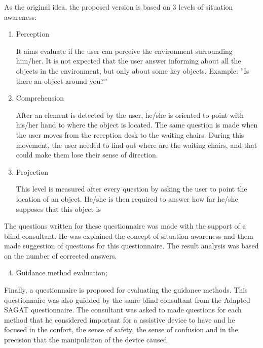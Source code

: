         As the original idea, the proposed version is based on 3 levels of situation awareness:

        \begin{enumerate}[leftmargin = 6em, label = Level \arabic* -- ]
            \item Perception
            
            It aims evaluate if the user can perceive the environment surrounding him/her. It is not expected that the user answer informing about all the objects in the environment, but only about some key objects. Example: ”Is there an object around you?”

            \item Comprehension
    
            After an element is detected by the user, he/she is oriented to point with his/her hand to where the object is located. The same question is made when the user moves from the reception desk to the waiting chairs. During this movement, the user needed to find out where are the waiting chairs, and that could make them lose their sense of direction.
    
            \item Projection
            
            This level is measured after every question by asking the user to point the location of an object. He/she is then required to answer how far he/she supposes that this object is
            
        \end{enumerate}      

        The questions written for these questionnaire was made with the support of a blind consultant. He was explained the concept of situation awareness and them made suggestion of questions for this questionnaire. The result analysis was based on the number of corrected answers.

        \begin{enumerate} [label = \Alph*)]
            \setcounter{enumi}{3}
            \item Guidance method evaluation;
        \end{enumerate}

        Finally, a questionnaire is proposed for evaluating the guidance methods. This questionnaire was also guidded by the same blind consultant from the Adapted SAGAT questionnaire. The consultant was asked to made questions for each method that he considered important for a assistive device to have and he focused in the confort, the sense of safety, the sense of confusion and in the precision that the manipulation of the device caused.
        
